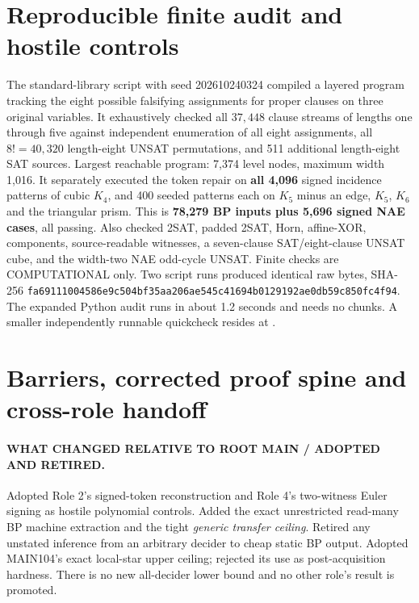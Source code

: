 \documentclass[11pt]{article}
\begin{document}
\section{Reproducible finite audit and hostile controls}
The standard-library script with seed 202610240324 compiled a layered program tracking the eight possible falsifying assignments for proper clauses on three original variables. It exhaustively checked all $37,448$ clause streams of lengths one through five against independent enumeration of all eight assignments, all $8!=40,320$ length-eight UNSAT permutations, and 511 additional length-eight SAT sources. Largest reachable program: 7,374 level nodes, maximum width 1,016. It separately executed the token repair on \textbf{all 4,096} signed incidence patterns of cubic $K_4$, and 400 seeded patterns each on $K_5$ minus an edge, $K_5$, $K_6$ and the triangular prism. This is \textbf{78,279 BP inputs plus 5,696 signed NAE cases}, all passing. Also checked 2SAT, padded 2SAT, Horn, affine-XOR, components, source-readable witnesses, a seven-clause SAT/eight-clause UNSAT cube, and the width-two NAE odd-cycle UNSAT. Finite checks are COMPUTATIONAL only. Two script runs produced identical raw bytes, SHA-256
\texttt{fa69111004586e9c504bf35aa206ae545c41694b0129192ae0db59c850fc4f94}.
The expanded Python audit runs in about 1.2 seconds and needs no chunks. A smaller independently runnable quickcheck resides at
.

\section{Barriers, corrected proof spine and cross-role handoff}
\paragraph{WHAT CHANGED RELATIVE TO ROOT MAIN / ADOPTED AND RETIRED.}
Adopted Role 2's signed-token reconstruction and Role 4's two-witness Euler signing as hostile polynomial controls. Added the exact unrestricted read-many BP machine extraction and the tight \emph{generic transfer ceiling}. Retired any unstated inference from an arbitrary decider to cheap static BP output. Adopted MAIN104's exact local-star upper ceiling; rejected its use as post-acquisition hardness. There is no new all-decider lower bound and no other role's result is promoted.
\end{document}
